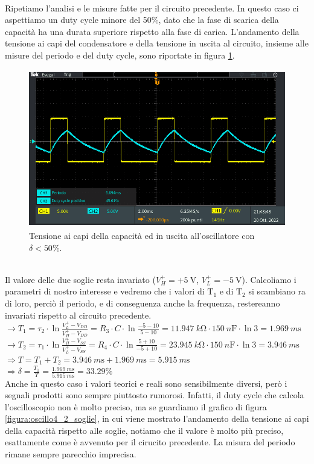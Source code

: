 \documentclass{report}
\begin{document}
\\Ripetiamo l'analisi e le misure fatte per il circuito precedente. In questo caso ci aspettiamo un duty cycle minore del 50\%, dato che la fase di scarica della capacità ha una durata superiore rispetto alla fase di carica. L'andamento della tensione ai capi del condensatore e della tensione in uscita al circuito, insieme alle misure del periodo e del duty cycle, sono riportate in figura \ref{figura:oscillo4_2}.
\begin{figure}[h!]
	\centering
	\includegraphics[height=6.9cm]{immagini/TEK00034}
	\caption{Tensione ai capi della capacità ed in uscita all'oscillatore con $\delta<50\%$.}
	\label{figura:oscillo4_2}
\end{figure}
\\Il valore delle due soglie resta invariato ($V_H^+=+\SI{5}{\volt}$, $V_L^+=\SI{-5}{\volt}$). Calcoliamo i parametri di nostro interesse e vedremo che i valori di $\mathrm{T_1}$ e di $\mathrm{T_2}$ si scambiano ra di loro, perciò il periodo, e di conseguenza anche la frequenza, restereanno invariati rispetto al circuito precedente. 
\\[4pt]\indent$\rightarrow\displaystyle{T_1=\tau_2\cdot\ln\frac{V_L^+-V_{DD}}{V_H^+-V_{DD}}=R_3\cdot C\cdot\ln\frac{-5-10}{5-10}=\SI{11.947}{k\ohm}\cdot\SI{150}{n\farad}\cdot\ln3}=\SI{1.969}{m\second}$
\\[6pt]\indent$\rightarrow\displaystyle{T_2=\tau_1\cdot\ln\frac{V_H^+-V_{SS}}{V_L^+-V_{SS}}=R_4\cdot C\cdot\ln\frac{5+10}{-5+10}=\SI{23.945}{k\ohm}\cdot\SI{150}{n\farad}\cdot\ln3}=\SI{3.946}{m\second}$
\\[6pt]\indent$\Rightarrow\displaystyle{T=T_1+T_2=\SI{3.946}{m\second}+\SI{1.969}{m\second}=\SI{5.915}{m\second}}$
\\[6pt]\indent$\Rightarrow\displaystyle{\delta=\frac{T_1}{T}=\frac{\SI{1.969}{m\second}}{\SI{5.915}{m\second}}= 33.29\%}$
\\[4pt]Anche in questo caso i valori teorici e reali sono sensibilmente diversi, però i segnali prodotti sono sempre piuttosto rumorosi. Infatti, il duty cycle che calcola l'oscilloscopio non è molto preciso, ma se guardiamo il grafico di figura \ref{figura:oscillo4_2_soglie}, in cui viene mostrato l'andamento della tensione ai capi della capacità rispetto alle soglie, notiamo che il valore è molto più preciso, esattamente come è avvenuto per il cirucito precedente. La misura del periodo rimane sempre parecchio imprecisa.
\end{document}
